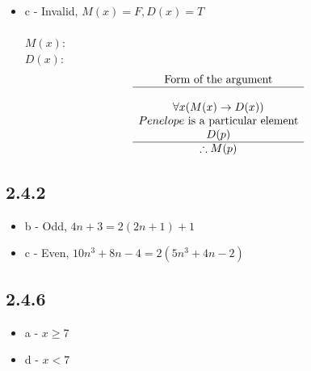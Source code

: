 \documentclass{article}
\begin{document}
\begin{itemize}
    \item c - Invalid, $M(x)=F, D(x)=T$ \\
    \\
    $M(x):$  \\
    $D(x):$  \\

    $$
    \begin{array}{c}
        \text{Form of the argument} \\
        \hline \\
        \forall x(M(x) \rightarrow D(x)) \\
        Penelope \text{ is a particular element} \\
        D(p) \\
        \hline
        \therefore M(p)
    \end{array}
    $$

\end{itemize}

\subsection*{2.4.2}
\begin{itemize}
    \item b - Odd, $4n + 3 = 2(2n + 1) + 1$
    \item c - Even, $10n^3 + 8n - 4 = 2(5n^3 + 4n -2)$
\end{itemize}

\subsection*{2.4.6}
\begin{itemize}
    \item a - $x \ge 7$
    \item d - $x < 7$
\end{itemize}
\end{document}
